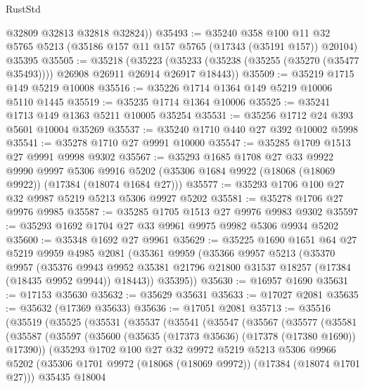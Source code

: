 \begin{lexlean}{RustStd}
\begin{coremodule}
        @32809
        @32813
        @32818
        @32824))
@35493 := @35240
    @358
    @100
    @11
    @32
    @5765
    @5213
    (@35186 @157 @11 @157 @5765 (@17343 (@35191 @157)) @20104)
    @35395
@35505 := @35218
    (@35223 (@35233 (@35238 (@35255 (@35270 (@35477 @35493)))) @26908 @26911 @26914 @26917 @18443))
@35509 := @35219 @1715 @149 @5219 @10008
@35516 := @35226 @1714 @1364 @149 @5219 @10006 @5110 @1445
@35519 := @35235 @1714 @1364 @10006
@35525 := @35241 @1713 @149 @1363 @5211 @10005 @35254
@35531 := @35256 @1712 @24 @393 @5601 @10004 @35269
@35537 := @35240 @1710 @440 @27 @392 @10002 @5998
@35541 := @35278 @1710 @27 @9991 @10000
@35547 := @35285 @1709 @1513 @27 @9991 @9998 @9302
@35567 := @35293
    @1685
    @1708
    @27
    @33
    @9922
    @9990
    @9997
    @5306
    @9916
    @5202
    (@35306 @1684 @9922 (@18068 (@18069 @9922)) (@17384 (@18074 @1684 @27)))
@35577 := @35293 @1706 @100 @27 @32 @9987 @5219 @5213 @5306 @9927 @5202
@35581 := @35278 @1706 @27 @9976 @9985
@35587 := @35285 @1705 @1513 @27 @9976 @9983 @9302
@35597 := @35293 @1692 @1704 @27 @33 @9961 @9975 @9982 @5306 @9934 @5202
@35600 := @35348 @1692 @27 @9961
@35629 := @35225
    @1690
    @1651
    @64
    @27
    @5219
    @9959
    @4985
    @2081
    (@35361
      @9959
      (@35366
        @9957
        @5213
        (@35370
          @9957
          (@35376
            @9943
            @9952
            @35381
            @21796
            @21800
            @31537
            @18257
            (@17384 (@18435 @9952 @9944))
            @18443))
        @35395))
@35630 := @16957 @1690
@35631 := @17153 @35630
@35632 := @35629 @35631
@35633 := @17027 @2081
@35635 := @35632 (@17369 @35633)
@35636 := @17051 @2081
@35713 := @35516
    (@35519
      (@35525
        (@35531
          (@35537
            (@35541
              (@35547
                (@35567
                  (@35577
                    (@35581
                      (@35587
                        (@35597
                          (@35600 (@35635 (@17373 @35636) (@17378 (@17380 @1690)) @17390))
                          (@35293
                            @1702
                            @100
                            @27
                            @32
                            @9972
                            @5219
                            @5213
                            @5306
                            @9966
                            @5202
                            (@35306 @1701 @9972 (@18068 (@18069 @9972)) (@17384 (@18074 @1701 @27)))
                            @35435
                            @18004

\end{coremodule}
\end{lexlean}
